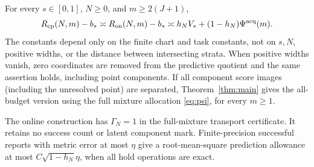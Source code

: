 \begin{theorem}\label{thm:sensor}
For every $s\in[0,1]$, $N\ge0$, and $m\ge2(J+1)$,
\begin{equation}\label{eq:sensor-law}
 R_{\mathrm{cp}}(N,m)-b_*\asymp R_{\mathrm{on}}(N,m)-b_*
 \asymp h_NV_*+(1-h_N)\Psi^{\rm acq}(m).
\end{equation}
The constants depend only on the finite chart and task constants, not on $s,N$, positive widths, or the distance between intersecting strata. When positive widths vanish, zero coordinates are removed from the predictive quotient and the same assertion holds, including point components. If all component score images (including the unresolved point) are separated, Theorem~\ref{thm:main} gives the all-budget version using the full mixture allocation \eqref{eq:psi}, for every $m\ge1$.

The online construction has $\Gamma_N=1$ in the full-mixture transport certificate. It retains no success count or latent component mark. Finite-precision successful reports with metric error at most $\eta$ give a root-mean-square prediction allowance at most $C\sqrt{1-h_N}\eta$, when all hold operations are exact.
\end{theorem}
